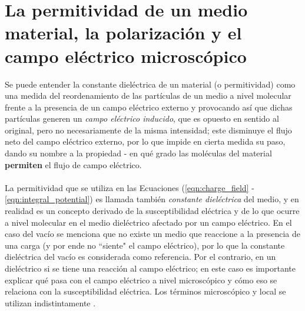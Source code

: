 \documentclass[12pt, oneside, numbers, spanish]{ezthesis}
\numberwithin{equation}{section}
\begin{document}
\section{La permitividad de un medio material, la polarización y el campo eléctrico microscópico}\label{Sec:perm_polarization_mic_E_field}
Se puede entender la constante dieléctrica de un material (o permitividad) como una medida del reordenamiento de las partículas de un medio a nivel molecular frente a la presencia de un campo eléctrico externo y provocando así que dichas partículas generen un \textit{campo eléctrico inducido}, que es opuesto en sentido al original, pero no necesariamente de la misma intensidad; este disminuye el flujo neto del campo eléctrico externo, por lo que impide en cierta medida su paso, dando su nombre a la propiedad - en qué grado las moléculas del material \textbf{permiten} el flujo de campo eléctrico.\\\\
La permitividad que se utiliza en las Ecuaciones (\ref{eqn:charge_field} - \ref{eqn:integral_potential}) es llamada también \textit{constante dieléctrica} del medio, y en realidad es un concepto derivado de la susceptibilidad eléctrica y de lo que ocurre a nivel molecular en el medio dieléctrico afectado por un campo eléctrico. En el caso del vacío se menciona que no existe un medio que reaccione a la presencia de una carga (y por ende no ``siente" el campo eléctrico), por lo que la constante dieléctrica del vacío es considerada como referencia. Por el contrario, en un dieléctrico si se tiene una reacción al campo eléctrico; en este caso es importante explicar qué pasa con el campo eléctrico a nivel microscópico y cómo eso se relaciona con la susceptibilidad eléctrica. Los términos microscópico y local se utilizan indistintamente \cite{Kantorovich}.
\end{document}
